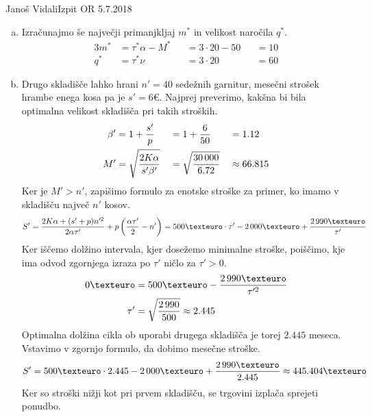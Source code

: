 \begin{naloga}{Janoš Vidali}{Izpit OR 5.7.2018}
\begin{odgovor}
\begin{enumerate}[(a)]
\item Izračunajmo še največji primanjkljaj $m^*$ in velikost naročila $q^*$.
\begin{alignat*}{3}
m^* &= \tau^* \alpha - M^* &&= 3 \cdot 20 - 50 &&= 10 \\
q^* &= \tau^* \nu &&= 3 \cdot 20 &&= 60
\end{alignat*}

\item Drugo skladišče lahko hrani $n' = 40$ sedežnih garnitur,
mesečni strošek hrambe enega kosa pa je $s' = 6 €$.
Najprej preverimo,
kakšna bi bila optimalna velikost skladišča pri takih stroških.
\begin{alignat*}{3}
\beta' &= 1 + {s' \over p} &&= 1 + {6 \over 50} &&= 1.12 \\
M' &= \sqrt{2K \alpha \over s' \beta'}
&&= \sqrt{30\,000 \over 6.72} &&\approx 66.815
\end{alignat*}
Ker je $M' > n'$,
zapišimo formulo za enotske stroške za primer,
ko imamo v skladišču največ $n'$ kosov.
$$
S' = {2K \alpha + (s'+p) n'^2 \over 2 \alpha \tau'}
+ p \left({\alpha \tau' \over 2} - n'\right)
= 500 € \cdot \tau' - 2\,000 € + {2\,990 € \over \tau'}
$$
Ker iščemo dolžino intervala, kjer dosežemo minimalne stroške, poiščimo,
kje ima odvod zgornjega izraza po $\tau'$ ničlo za $\tau' > 0$.
\begin{align*}
0 € &= 500 € - {2\,990 € \over \tau'^2} \\
\tau' &= \sqrt{2\,990 \over 500} \approx 2.445
\end{align*}
Optimalna dolžina cikla ob uporabi drugega skladišča je torej $2.445$ meseca.
Vstavimo v zgornjo formulo, da dobimo mesečne stroške.
$$
S' = 500 € \cdot 2.445 - 2\,000 € + {2\,990 € \over 2.445} \approx 445.404 €
$$
Ker so stroški nižji kot pri prvem skladišču,
se trgovini izplača sprejeti ponudbo.
\end{enumerate}
\end{odgovor}
\end{naloga}

